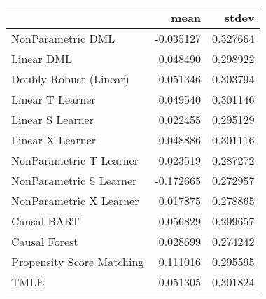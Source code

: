 \begin{tabular}{lrr}
\toprule
{} &      mean &     stdev \\
\midrule
NonParametric DML         & -0.035127 &  0.327664 \\
Linear DML                &  0.048490 &  0.298922 \\
Doubly Robust (Linear)    &  0.051346 &  0.303794 \\
Linear T Learner          &  0.049540 &  0.301146 \\
Linear S Learner          &  0.022455 &  0.295129 \\
Linear X Learner          &  0.048886 &  0.301116 \\
NonParametric T Learner   &  0.023519 &  0.287272 \\
NonParametric S Learner   & -0.172665 &  0.272957 \\
NonParametric X Learner   &  0.017875 &  0.278865 \\
Causal BART               &  0.056829 &  0.299657 \\
Causal Forest             &  0.028699 &  0.274242 \\
Propensity Score Matching &  0.111016 &  0.295595 \\
TMLE                      &  0.051305 &  0.301824 \\
\bottomrule
\end{tabular}
